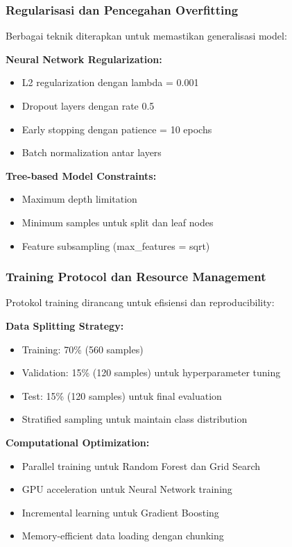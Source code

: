 \subsubsection{Regularisasi dan Pencegahan Overfitting}
\label{sec:regularisasi}

Berbagai teknik diterapkan untuk memastikan generalisasi model:

\textbf{Neural Network Regularization:}
\begin{itemize}
    \item L2 regularization dengan lambda = 0.001
    \item Dropout layers dengan rate 0.5
    \item Early stopping dengan patience = 10 epochs
    \item Batch normalization antar layers
\end{itemize}

\textbf{Tree-based Model Constraints:}
\begin{itemize}
    \item Maximum depth limitation
    \item Minimum samples untuk split dan leaf nodes
    \item Feature subsampling (max\_features = sqrt)
\end{itemize}

\subsubsection{Training Protocol dan Resource Management}
\label{sec:trainingProtocol}

Protokol training dirancang untuk efisiensi dan reproducibility:

\textbf{Data Splitting Strategy:}
\begin{itemize}
    \item Training: 70\% (560 samples)
    \item Validation: 15\% (120 samples) untuk hyperparameter tuning
    \item Test: 15\% (120 samples) untuk final evaluation
    \item Stratified sampling untuk maintain class distribution
\end{itemize}

\textbf{Computational Optimization:}
\begin{itemize}
    \item Parallel training untuk Random Forest dan Grid Search
    \item GPU acceleration untuk Neural Network training
    \item Incremental learning untuk Gradient Boosting
    \item Memory-efficient data loading dengan chunking
\end{itemize}

